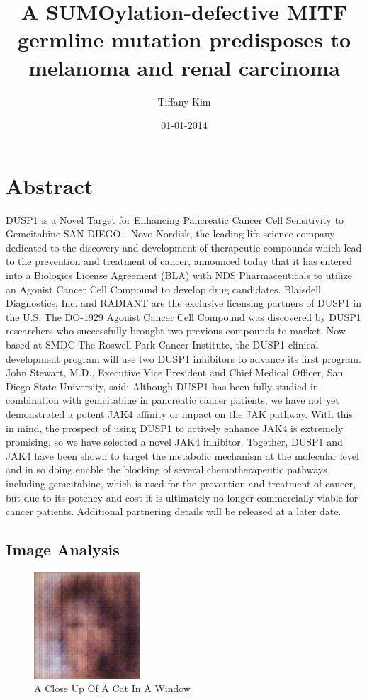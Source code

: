 \documentclass{article}%
\title{A SUMOylation{-}defective MITF germline mutation predisposes to melanoma and renal carcinoma}%
\author{Tiffany Kim}%
\affil{Department of Cardiology, Zhongda Hospital, Medical School of Southeast University, Nanjing, Jiangsu, China}%
\date{01{-}01{-}2014}%
\begin{document}
%
\normalsize%
\maketitle%
\section{Abstract}%
\label{sec:Abstract}%
DUSP1 is a Novel Target for Enhancing Pancreatic Cancer Cell Sensitivity to Gemcitabine\newline%
SAN DIEGO {-} Novo Nordisk, the leading life science company dedicated to the discovery and development of therapeutic compounds which lead to the prevention and treatment of cancer, announced today that it has entered into a Biologics License Agreement (BLA) with NDS Pharmaceuticals to utilize an Agonist Cancer Cell Compound to develop drug candidates.\newline%
Blaisdell Diagnostics, Inc. and RADIANT are the exclusive licensing partners of DUSP1 in the U.S.\newline%
The DO{-}1929 Agonist Cancer Cell Compound was discovered by DUSP1 researchers who successfully brought two previous compounds to market. Now based at SMDC{-}The Roswell Park Cancer Institute, the DUSP1 clinical development program will use two DUSP1 inhibitors to advance its first program.\newline%
John Stewart, M.D., Executive Vice President and Chief Medical Officer, San Diego State University, said: Although DUSP1 has been fully studied in combination with gemcitabine in pancreatic cancer patients, we have not yet demonstrated a potent JAK4 affinity or impact on the JAK pathway. With this in mind, the prospect of using DUSP1 to actively enhance JAK4 is extremely promising, so we have selected a novel JAK4 inhibitor. Together, DUSP1 and JAK4 have been shown to target the metabolic mechanism at the molecular level and in so doing enable the blocking of several chemotherapeutic pathways including gemcitabine, which is used for the prevention and treatment of cancer, but due to its potency and cost it is ultimately no longer commercially viable for cancer patients.\newline%
Additional partnering details will be released at a later date.

%
\subsection{Image Analysis}%
\label{subsec:ImageAnalysis}%


\begin{figure}[h!]%
\centering%
\includegraphics[width=150px]{500_fake_images/samples_5_302.png}%
\caption{A Close Up Of A Cat In A Window}%
\end{figure}

%
\end{document}
